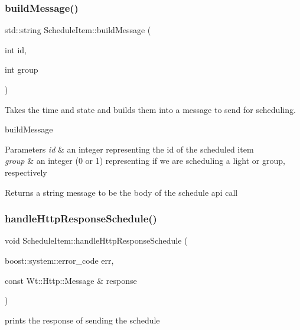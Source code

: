\subsubsection{\texorpdfstring{build\+Message()}{buildMessage()}}
{\footnotesize\ttfamily std\+::string Schedule\+Item\+::build\+Message (\begin{DoxyParamCaption}\item[{int}]{id,  }\item[{int}]{group }\end{DoxyParamCaption})\hspace{0.3cm}{\ttfamily [private]}}



Takes the time and state and builds them into a message to send for scheduling. 

build\+Message 
\begin{DoxyParams}{Parameters}
{\em id} & an integer representing the id of the scheduled item \\
\hline
{\em group} & an integer (0 or 1) representing if we are scheduling a light or group, respectively \\
\hline
\end{DoxyParams}
\begin{DoxyReturn}{Returns}
a string message to be the body of the schedule api call 
\end{DoxyReturn}
\mbox{\label{class_schedule_item_af80dc4ae6e2c7400ed74572621d40739}} 
\subsubsection{\texorpdfstring{handle\+Http\+Response\+Schedule()}{handleHttpResponseSchedule()}}
{\footnotesize\ttfamily void Schedule\+Item\+::handle\+Http\+Response\+Schedule (\begin{DoxyParamCaption}\item[{boost\+::system\+::error\+\_\+code}]{err,  }\item[{const Wt\+::\+Http\+::\+Message \&}]{response }\end{DoxyParamCaption})\hspace{0.3cm}{\ttfamily [private]}}



prints the response of sending the schedule 

